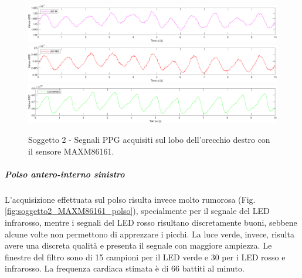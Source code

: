\begin{figure}[h]
	\centering
	\includegraphics[width=1\linewidth]{ImageFiles/Misure Preliminari/Soggetto 2/maxm86161/lobo_ir_moving_avg}
	\includegraphics[width=1\linewidth]{ImageFiles/Misure Preliminari/Soggetto 2/maxm86161/lobo_red_moving_avg}
	\includegraphics[width=1\linewidth]{ImageFiles/Misure Preliminari/Soggetto 2/maxm86161/lobo_green_moving_avg}
	\caption{Soggetto 2 - Segnali PPG acquisiti sul lobo dell'orecchio destro con il sensore MAXM86161.}
	\label{fig:soggetto2_MAXM86161_lobo}
\end{figure}

\clearpage

\subparagraph{Polso antero-interno sinistro}
L'acquisizione effettuata sul polso risulta invece molto rumorosa (Fig. \ref{fig:soggetto2_MAXM86161_polso}), specialmente per il segnale del LED infrarosso, mentre i segnali del LED rosso risultano discretamente buoni, sebbene alcune volte non permettono di apprezzare i picchi. La luce verde, invece, risulta avere una discreta qualità e presenta il segnale con maggiore ampiezza. Le finestre del filtro sono di 15 campioni per il LED verde e 30 per i LED rosso e infrarosso. La frequenza cardiaca stimata è di 66 battiti al minuto.

